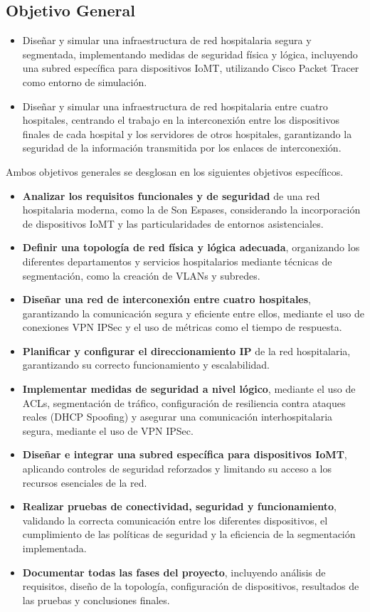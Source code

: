 \subsection{Objetivo General}
\begin{itemize}
    \item Diseñar y simular una infraestructura de red hospitalaria segura y segmentada, implementando medidas de seguridad física y lógica, incluyendo una subred específica para 
dispositivos \ac{IoMT}, utilizando Cisco Packet Tracer como entorno de simulación.
    \item Diseñar y simular una infraestructura de red hospitalaria entre cuatro hospitales, centrando el trabajo en la interconexión entre los dispositivos finales de cada hospital 
y los servidores de otros hospitales, garantizando la seguridad de la información transmitida por los enlaces de interconexión.
\end{itemize}

Ambos objetivos generales se desglosan en los siguientes objetivos específicos.
\begin{itemize}
    \item \textbf{Analizar los requisitos funcionales y de seguridad} de una red hospitalaria moderna, como la de Son Espases, considerando la incorporación de dispositivos IoMT y las 
    particularidades de entornos asistenciales.
    \item \textbf{Definir una topología de red física y lógica adecuada}, organizando los diferentes departamentos y servicios hospitalarios mediante técnicas de 
    segmentación, como la creación de VLANs y subredes.
    \item \textbf{Diseñar una red de interconexión entre cuatro hospitales}, garantizando la comunicación segura y eficiente entre ellos, mediante el uso de conexiones \ac{VPN} \ac{IPSec} y el uso de métricas como el tiempo de respuesta.
    \item \textbf{Planificar y configurar el direccionamiento \ac{IP}} de la red hospitalaria, garantizando su correcto funcionamiento y escalabilidad.
    \item \textbf{Implementar medidas de seguridad a nivel lógico}, mediante el uso de \ac{ACL}s, segmentación de tráfico, configuración de resiliencia contra ataques reales (DHCP Spoofing) 
    y asegurar una comunicación interhospitalaria segura, mediante el uso de VPN IPSec.
    \item \textbf{Diseñar e integrar una subred específica para dispositivos IoMT}, aplicando controles de seguridad reforzados y limitando su acceso a los recursos esenciales de la red.
    \item \textbf{Realizar pruebas de conectividad, seguridad y funcionamiento}, validando la correcta comunicación entre los diferentes dispositivos, el cumplimiento de las políticas de 
    seguridad y la eficiencia de la segmentación implementada.
    \item \textbf{Documentar todas las fases del proyecto}, incluyendo análisis de requisitos, diseño de la topología, configuración de dispositivos, resultados de las pruebas y conclusiones 
    finales.
\end{itemize}

